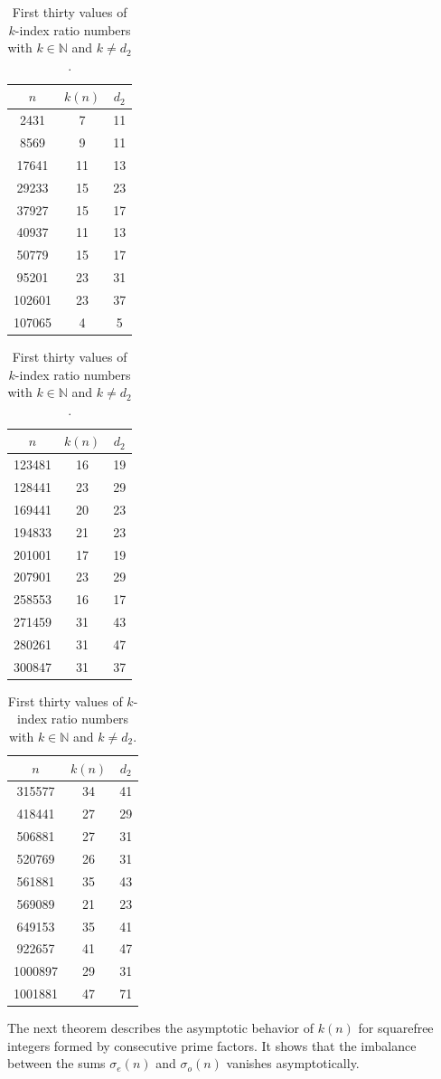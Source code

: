 \documentclass[12pt,reqno]{article}
\begin{document}
\begin{table}[ht]
\centering
\begin{tabular}{|c|c|c|}
\hline
$n$ & $k(n)$ & $d_2$\\
\hline
2431 & 7 & 11\\
8569 & 9 & 11\\
17641&  11 & 13\\
29233 & 15 & 23\\
37927 & 15 & 17\\
40937 & 11 & 13\\
50779 & 15&  17\\
95201 & 23&  31\\
102601 & 23&  37\\
107065 & 4&  5\\
\hline
\end{tabular}
\begin{tabular}{|c|c|c|}
\hline
$n$ & $k(n)$ & $d_2$\\
\hline
123481& 16 &19\\
128441& 23 &29\\
169441 &20 &23\\
194833& 21& 23\\
201001& 17 &19\\
207901 &23 &29\\
258553& 16 &17\\
271459 &31 &43\\
280261 &31 &47\\
300847 &31 &37\\
\hline
\end{tabular}
\begin{tabular}{|c|c|c|}
\hline
$n$ & $k(n)$ & $d_2$\\
\hline
315577 &34 &41\\
418441 &27 &29\\
506881 &27 &31\\
520769 &26 &31\\
561881 &35 &43\\
569089 &21 &23\\
649153 &35 &41\\
922657 &41 &47\\
1000897 &29 &31\\
1001881 &47 &71\\
\hline
\end{tabular}
\caption{First thirty values of $k$-index ratio numbers with $k\in\mathbb{N}$ and $k\neq d_2$.}
\label{tab:s}
\end{table}

The next theorem describes the asymptotic behavior of \(k(n)\) for squarefree integers formed by consecutive prime factors. It shows that the imbalance between the sums $\sigma_e(n)$ and $\sigma_o(n)$ vanishes asymptotically.
\end{document}
